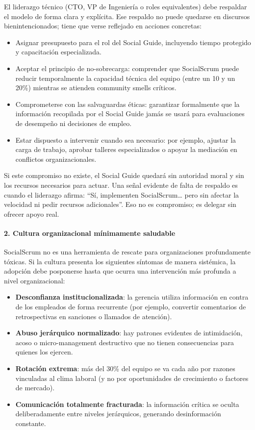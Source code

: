 El liderazgo técnico (CTO, VP de Ingeniería o roles equivalentes) debe respaldar el modelo de forma clara y explícita. Ese respaldo no puede quedarse en discursos bienintencionados; tiene que verse reflejado en acciones concretas:

\begin{itemize}
    \item Asignar presupuesto para el rol del Social Guide, incluyendo tiempo protegido y capacitación especializada.
    \item Aceptar el principio de no-sobrecarga: comprender que SocialScrum puede reducir temporalmente la capacidad técnica del equipo (entre un 10 y un 20\%) mientras se atienden community smells críticos.
    \item Comprometerse con las salvaguardas éticas: garantizar formalmente que la información recopilada por el Social Guide jamás se usará para evaluaciones de desempeño ni decisiones de empleo.
    \item Estar dispuesto a intervenir cuando sea necesario: por ejemplo, ajustar la carga de trabajo, aprobar talleres especializados o apoyar la mediación en conflictos organizacionales.
\end{itemize}

Si este compromiso no existe, el Social Guide quedará sin autoridad moral y sin los recursos necesarios para actuar. Una señal evidente de falta de respaldo es cuando el liderazgo afirma: ``Sí, implementen SocialScrum… pero sin afectar la velocidad ni pedir recursos adicionales''. Eso no es compromiso; es delegar sin ofrecer apoyo real.

\paragraph{2. Cultura organizacional mínimamente saludable}

SocialScrum no es una herramienta de rescate para organizaciones profundamente tóxicas. Si la cultura presenta los siguientes síntomas de manera sistémica, la adopción debe posponerse hasta que ocurra una intervención más profunda a nivel organizacional:

\begin{itemize}
    \item \textbf{Desconfianza institucionalizada}: la gerencia utiliza información en contra de los empleados de forma recurrente (por ejemplo, convertir comentarios de retrospectivas en sanciones o llamados de atención).
    \item \textbf{Abuso jerárquico normalizado}: hay patrones evidentes de intimidación, acoso o micro-management destructivo que no tienen consecuencias para quienes los ejercen.
    \item \textbf{Rotación extrema}: más del 30\% del equipo se va cada año por razones vinculadas al clima laboral (y no por oportunidades de crecimiento o factores de mercado).
    \item \textbf{Comunicación totalmente fracturada}: la información crítica se oculta deliberadamente entre niveles jerárquicos, generando desinformación constante.
\end{itemize}

